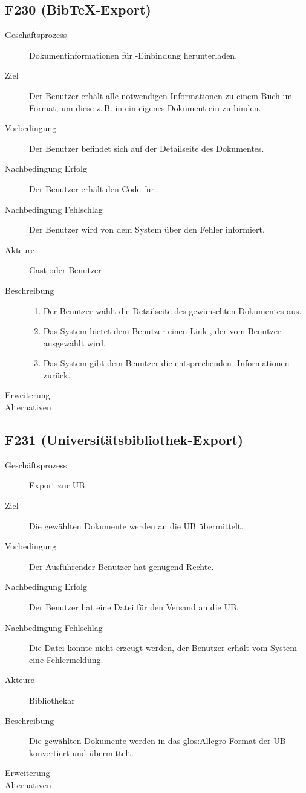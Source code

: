 \subsection{F230 (Bib\TeX -Export)}
\begin{description}
  \item[Geschäftsprozess]Dokumentinformationen für \BibTeX-Einbindung herunterladen.
  \item[Ziel]Der Benutzer erhält alle notwendigen Informationen zu einem Buch im \BibTeX-Format, um diese z.\,B. in ein eigenes Dokument ein zu binden.
  \item[Vorbedingung]Der Benutzer befindet sich auf der Detailseite des Dokumentes.
  \item[Nachbedingung Erfolg]Der Benutzer erhält den Code für \BibTeX .
  \item[Nachbedingung Fehlschlag]Der Benutzer wird von dem System über den Fehler informiert.
  \item[Akteure]Gast oder Benutzer
  \item[Beschreibung]\hfill
    \begin{enumerate}
      \item Der Benutzer wählt die Detailseite des gewünschten Dokumentes aus.
      \item Das System bietet dem Benutzer einen Link \emph{\BibTeX}, der vom Benutzer ausgewählt wird.
      \item Das System gibt dem Benutzer die entsprechenden \BibTeX -Informationen zurück.
    \end{enumerate}
  \item[Erweiterung]
  \item[Alternativen]
\end{description}

\subsection{F231 (Universitätsbibliothek-Export)}
\begin{description}
  \item[Geschäftsprozess]Export zur \gls{UB}.
  \item[Ziel]Die gewählten Dokumente werden an die \gls{UB} übermittelt.
  \item[Vorbedingung]Der Ausführender Benutzer hat genügend Rechte.
  \item[Nachbedingung Erfolg]Der Benutzer hat eine Datei für den Versand an die \gls{UB}.
  \item[Nachbedingung Fehlschlag]Die Datei konnte nicht erzeugt werden, der Benutzer erhält vom System eine Fehlermeldung.
  \item[Akteure]Bibliothekar
  \item[Beschreibung]Die gewählten Dokumente werden in das \gls{glos:Allegro}-Format der \gls{UB} konvertiert und übermittelt.
  \item[Erweiterung]
  \item[Alternativen]
\end{description}


